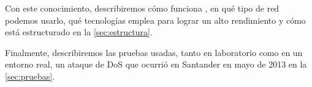 Con este conocimiento, describiremos cómo funciona 
\redborderddos{}, en qué tipo de red podemos usarlo, qué
tecnologías emplea para lograr un alto rendimiento y cómo está
estructurado en la \autoref{sec:estructura}.

Finalmente, describiremos las pruebas usadas, tanto en
laboratorio como en un entorno real, un ataque de \gls{DoS}
que ocurrió en Santander en mayo de 2013 en la
\autoref{sec:pruebas}.





\endinput
